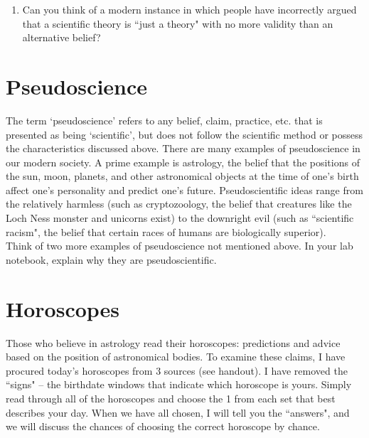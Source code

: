 \documentclass[12pt]{article}
\begin{document}
\begin{enumerate}
\item Can you think of a modern instance in which people have incorrectly argued that a scientific theory is ``just a theory" with no more validity than an alternative belief?
\end{enumerate} 

\section{Pseudoscience}
The term `pseudoscience' refers to any belief, claim, practice, etc. that is presented as being `scientific', but does not follow the scientific method or possess the characteristics discussed above. There are many examples of pseudoscience in our modern society. A prime example is astrology, the belief that the positions of the sun, moon, planets, and other astronomical objects at the time of one's birth affect one's personality and predict one's future. Pseudoscientific ideas range from the relatively harmless (such as cryptozoology, the belief that creatures like the Loch Ness monster and unicorns exist) to the downright evil (such as ``scientific racism", the belief that certain races of humans are biologically superior). \\

\noindent Think of two more examples of pseudoscience not mentioned above. In your lab notebook, explain why they are pseudoscientific. 

\section{Horoscopes}
Those who believe in astrology read their horoscopes: predictions and advice based on the position of astronomical bodies. To examine these claims, I have procured today's horoscopes from 3 sources (see handout). I have removed the ``signs" -- the birthdate windows that indicate which horoscope is yours. Simply read through all of the horoscopes and choose the 1 from each set that best describes your day. When we have all chosen, I will tell you the ``answers", and we will discuss the chances of choosing the correct horoscope by chance. \\
\end{document}
